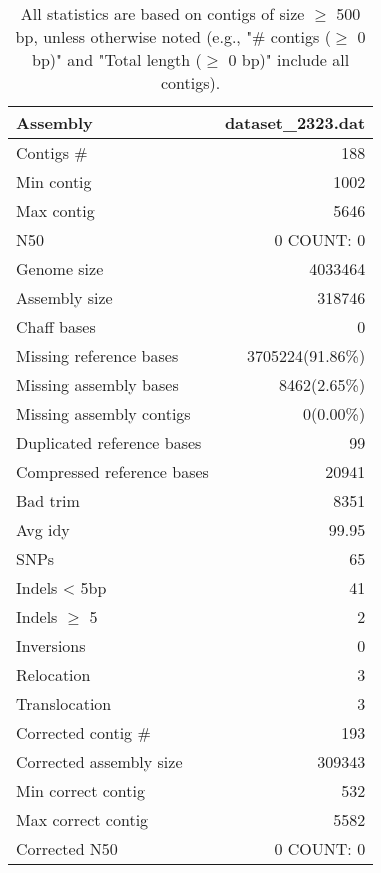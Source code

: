 \documentclass[12pt,a4paper]{article}
\begin{document}
\begin{table}[ht]
\begin{center}
\caption{All statistics are based on contigs of size $\geq$ 500 bp, unless otherwise noted (e.g., "\# contigs ($\geq$ 0 bp)" and "Total length ($\geq$ 0 bp)" include all contigs).}
\begin{tabular}{|l*{1}{|r}|}
\hline
Assembly & dataset\_2323.dat \\ \hline
Contigs \# & 188 \\ \hline
Min contig & 1002 \\ \hline
Max contig & 5646 \\ \hline
N50 & 0 COUNT: 0 \\ \hline
Genome size & 4033464 \\ \hline
Assembly size & 318746 \\ \hline
Chaff bases & 0 \\ \hline
Missing reference bases & 3705224(91.86\%) \\ \hline
Missing assembly bases & 8462(2.65\%) \\ \hline
Missing assembly contigs & 0(0.00\%) \\ \hline
Duplicated reference bases & 99 \\ \hline
Compressed reference bases & 20941 \\ \hline
Bad trim & 8351 \\ \hline
Avg idy & 99.95 \\ \hline
SNPs & 65 \\ \hline
Indels < 5bp & 41 \\ \hline
Indels $\geq$ 5 & 2 \\ \hline
Inversions & 0 \\ \hline
Relocation & 3 \\ \hline
Translocation & 3 \\ \hline
Corrected contig \# & 193 \\ \hline
Corrected assembly size & 309343 \\ \hline
Min correct contig & 532 \\ \hline
Max correct contig & 5582 \\ \hline
Corrected N50 & 0 COUNT: 0 \\ \hline
\end{tabular}
\end{center}
\end{table}
\end{document}
